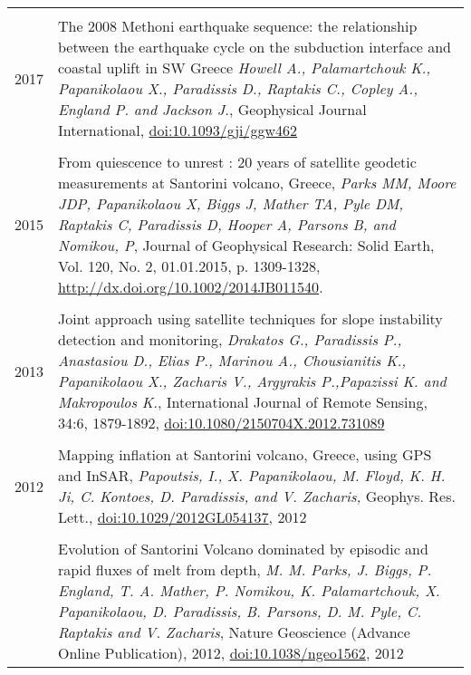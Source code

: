 \documentclass[a4paper,10pt]{article} %
\begin{document}
\begin{longtable}{r|p{14cm}}

\multicolumn{2}{c}{} \\
  \textsc{2017}

  & The 2008 Methoni earthquake sequence: the relationship between the earthquake cycle on the subduction interface and coastal uplift in SW Greece
  \emph{Howell A., Palamartchouk K., Papanikolaou X., Paradissis D., Raptakis C., Copley A., England P. and Jackson J.}, Geophysical Journal International, \href{https://doi.org/10.1093/gji/ggw462}{doi:10.1093/gji/ggw462}\\

\multicolumn{2}{c}{} \\
  \textsc{2015}

  & From quiescence to unrest : 20 years of satellite geodetic measurements at Santorini volcano, Greece,
  \emph{Parks MM, Moore JDP, Papanikolaou X, Biggs J, Mather TA, Pyle DM, Raptakis C, Paradissis D, Hooper A, Parsons B, and Nomikou, P}, Journal of Geophysical Research: Solid Earth, Vol. 120, No. 2, 01.01.2015, p. 1309-1328, \href{http://dx.doi.org/10.1002/2014JB011540}{http://dx.doi.org/10.1002/2014JB011540}.\\
  
\multicolumn{2}{c}{} \\ 
  \textsc{2013}

  & Joint approach using satellite techniques for slope instability detection and monitoring,
  \emph{Drakatos G., Paradissis P., Anastasiou D., Elias P., Marinou A., Chousianitis K., Papanikolaou X., Zacharis V., Argyrakis P.,Papazissi K. and Makropoulos K.},
  International Journal of Remote Sensing, 34:6, 1879-1892, \href{http://www.tandfonline.com/doi/abs/10.1080/2150704X.2012.731089#.Uxni9meIaig}{doi:10.1080/2150704X.2012.731089}\\

\multicolumn{2}{c}{} \\ 
  \textsc{2012}
  & Mapping inflation at Santorini volcano, Greece, using GPS and InSAR,
  \emph{Papoutsis, I., X. Papanikolaou, M. Floyd, K. H. Ji, C. Kontoes, D. Paradissis, and V. Zacharis,}
  Geophys. Res. Lett., \href{http://www.agu.org/pubs/crossref/pip/2012GL054137.shtml}{doi:10.1029/2012GL054137}, 2012\\

  &\\

  & Evolution of Santorini Volcano dominated by episodic and rapid fluxes of melt from depth,
  \emph{M. M. Parks, J. Biggs, P. England, T. A. Mather, P. Nomikou, K. Palamartchouk, X. Papanikolaou, D. Paradissis, B. Parsons, D. M. Pyle, C. Raptakis and V. Zacharis},
  Nature Geoscience (Advance Online Publication), 2012, \href{http://www.nature.com/ngeo/journal/v5/n10/full/ngeo1562.html}{doi:10.1038/ngeo1562}, 2012\\


\end{longtable}
\end{document}
